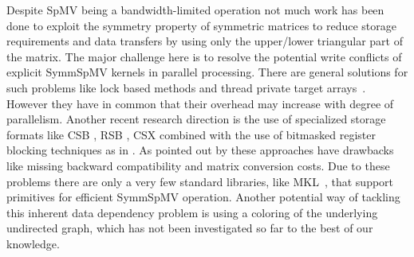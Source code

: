 


Despite \acrshort{SpMV} being a bandwidth-limited operation not much work has 
been done to exploit the symmetry property of symmetric matrices to reduce
storage requirements and data transfers by using only the upper/lower triangular part of the matrix.
The major challenge here is to resolve the potential write conflicts of explicit \acrshort{SymmSpMV} kernels in parallel processing.
There are general solutions for such problems like 
lock based methods and thread private target
arrays~\cite{sparseX,thread_private_symm_spmv,Krotkiewski:2010:PSS:1752612.1752682,Mironowicz:2015}. However they have in common that their overhead may increase with degree of parallelism.
Another recent research direction is the use of specialized storage formats 
like CSB \cite{CSB}, RSB \cite{RSB}, CSX \cite{sparseX} combined with the use of bitmasked 
register blocking techniques as in \cite{Buluc:2011:RMA:2058524.2059503}. As pointed out 
by \cite{liu2015spmv} these approaches have drawbacks like missing backward compatibility and matrix conversion costs. 
Due to these problems there are only a very few standard libraries, like 
\acrshort{MKL}~\cite{MKL}, that support primitives for efficient \acrshort{SymmSpMV} operation.
Another potential way of tackling this inherent data dependency problem is using a \DTWO coloring 
 of the underlying undirected graph, which has not been investigated so far to the best of our knowledge.

